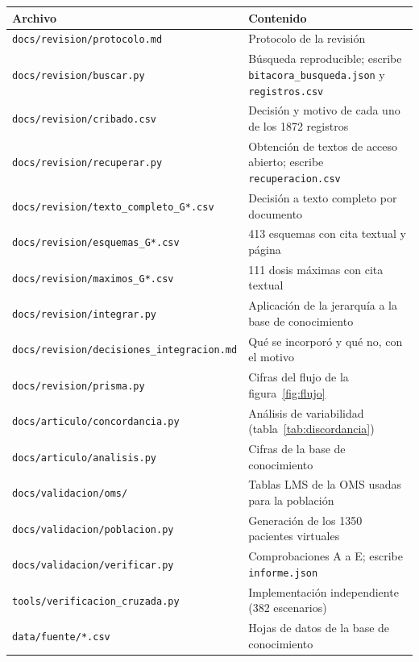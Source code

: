 \documentclass[11pt,a4paper]{article}
\newcommand{\codigo}[1]{\texttt{\small #1}}
\begin{document}
\begin{table}[htbp]
\centering
\small
\begin{tabularx}{\textwidth}{@{}lX@{}}
\toprule
Archivo & Contenido \\
\midrule
\codigo{docs/revision/protocolo.md} & Protocolo de la revisión \\
\codigo{docs/revision/buscar.py} & Búsqueda reproducible; escribe \codigo{bitacora\_busqueda.json} y \codigo{registros.csv} \\
\codigo{docs/revision/cribado.csv} & Decisión y motivo de cada uno de los \num{1872} registros \\
\codigo{docs/revision/recuperar.py} & Obtención de textos de acceso abierto; escribe \codigo{recuperacion.csv} \\
\codigo{docs/revision/texto\_completo\_G*.csv} & Decisión a texto completo por documento \\
\codigo{docs/revision/esquemas\_G*.csv} & 413 esquemas con cita textual y página \\
\codigo{docs/revision/maximos\_G*.csv} & 111 dosis máximas con cita textual \\
\codigo{docs/revision/integrar.py} & Aplicación de la jerarquía a la base de conocimiento \\
\codigo{docs/revision/decisiones\_integracion.md} & Qué se incorporó y qué no, con el motivo \\
\codigo{docs/revision/prisma.py} & Cifras del flujo de la figura~\ref{fig:flujo} \\
\codigo{docs/articulo/concordancia.py} & Análisis de variabilidad (tabla~\ref{tab:discordancia}) \\
\codigo{docs/articulo/analisis.py} & Cifras de la base de conocimiento \\
\codigo{docs/validacion/oms/} & Tablas LMS de la OMS usadas para la población \\
\codigo{docs/validacion/poblacion.py} & Generación de los \num{1350} pacientes virtuales \\
\codigo{docs/validacion/verificar.py} & Comprobaciones A a E; escribe \codigo{informe.json} \\
\codigo{tools/verificacion\_cruzada.py} & Implementación independiente (382 escenarios) \\
\codigo{data/fuente/*.csv} & Hojas de datos de la base de conocimiento \\
\bottomrule
\end{tabularx}
\end{table}
\end{document}
